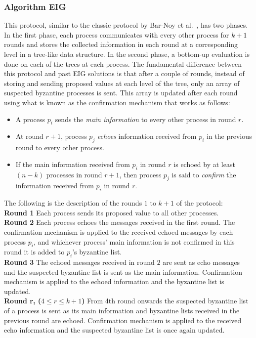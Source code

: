 \subsubsection{Algorithm EIG \cite{KM13}}
This protocol, similar to the classic protocol by Bar-Noy et al.~\cite{Bar-NoyD91}, has two phases. In the first phase, each process communicates with every other process for $k + 1$ rounds and stores the collected information in each round at a corresponding level in a tree-like data structure. In the second phase, a bottom-up evaluation is done on each of the trees at each process. The fundamental difference between this protocol and past EIG solutions is that after a couple of rounds, instead of storing and sending proposed values at each level of the tree, only an array of suspected byzantine processes is sent. This array is updated after each round using what is known as the confirmation mechanism that works as follows:
\begin{itemize}
\item A process $p_i$ sends the \textit{main information} to every other process in round $r$.
\item At round $r+1$, process $p_j$ \textit{echoes} information received from $p_i$ in the previous round to every other process. 
\item If the main information received from $p_i$ in round $r$ is echoed by at least $(n - k)$ processes in round $r+1$, then process $p_j$ is said to \textit{confirm} the information received from $p_i$ in round $r$.
    \end{itemize}
    The following is the description of the rounds $1$ to $k+1$ of the protocol: \\
    \textbf{Round 1} Each process sends its proposed value to all other processes. \\
    \textbf{Round 2} Each process echoes the messages received in the first round.
    The confirmation mechanism is applied to the received echoed messages by each process $p_i$, and whichever process' main information is not confirmed in this round it is added to $p_i$'s byzantine list. \\
    \textbf{Round 3} The echoed messages received in round $2$ are sent as echo messages and the suspected byzantine list is sent as the main information. Confirmation mechanism is applied to the echoed information and the byzantine list is updated. \\
    \textbf{Round r, ($4 \leq r \leq k+1$)} From 4th round onwards the suspected byzantine list of a process is sent as its main information and byzantine lists received in the previous round are echoed. Confirmation mechanism is applied to the received echo information and the suspected byzantine list is once again updated.

